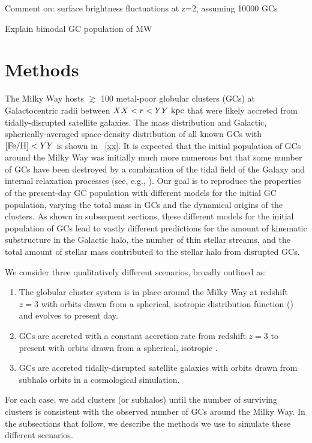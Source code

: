 \documentclass[manuscript, letterpaper]{aastex6}
\begin{document}
Comment on: surface brightness fluctuations at z=2, assuming 10000 GCs

Explain bimodal GC population of MW

\section{Methods}\label{sec:methods}

The Milky Way hosts $\gtrsim$ 100 metal-poor globular clusters (GCs) at
Galactocentric radii between $XX < r < YY~\mathrm{kpc}$ that were likely accreted from
tidally-disrupted satellite galaxies.
The mass distribution and Galactic, spherically-averaged space-density
distribution of all known GCs with ${\rm [Fe/H]} < YY$ is shown in
\figname~\ref{xx}.
It is expected that the initial population of GCs around the Milky Way was
initially much more numerous but that some number of GCs have been destroyed by
a combination of the tidal field of the Galaxy and internal relaxation
processes (see, e.g., \citealt{Gnedin:1999}).
Our goal is to reproduce the properties of the present-day GC population with
different models for the initial GC population, varying the total mass in GCs
and the dynamical origins of the clusters.
As shown in subsequent sections, these different models for the initial
population of GCs lead to vastly different predictions for the amount of
kinematic substructure in the Galactic halo, the number of thin stellar streams,
and the total amount of stellar mass contributed to the stellar halo from
disrupted GCs.

We consider three qualitatively different scenarios, broadly outlined as:
\begin{enumerate}
  \item The globular cluster system is in place around the Milky Way at redshift
    $z=3$ with orbits drawn from a spherical, isotropic distribution function
    () and evolves to present day.
  \item GCs are accreted with a constant accretion rate from redshift $z=3$ to
    present with orbits drawn from a spherical, isotropic .
  \item GCs are accreted tidally-disrupted satellite galaxies with orbits drawn
    from subhalo orbits in a cosmological simulation.
\end{enumerate}
For each case, we add clusters (or subhalos) until the number of surviving
clusters is consistent with the observed number of GCs around the Milky Way.
In the subsections that follow, we describe the methods we use to simulate these
different scenarios.
\end{document}
